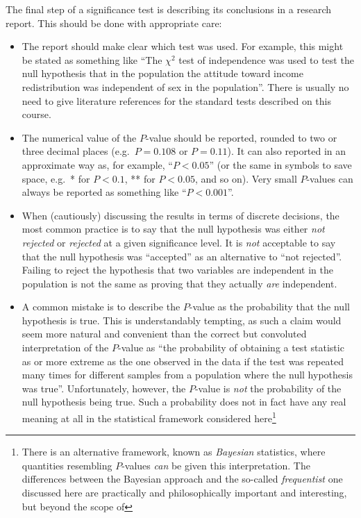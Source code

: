 The final step of a significance test is describing its conclusions in a
research report. This should be done with appropriate care:
\begin{itemize}
\item
The report should make clear which test was used. For example, this
might be stated as something like ``The $\chi^{2}$ test of independence
was used to test the null hypothesis that in the population the attitude toward income
redistribution was independent of sex in the population''.
There is usually no need to give literature references
for the standard tests described on this course.
\item
The numerical value of the $P$-value should be reported, rounded
to two or three decimal places (e.g.\ $P=0.108$ or $P=0.11$). It can
also reported in an approximate way
as, for example, ``$P<0.05$'' (or the
same in symbols to save space,
e.g.\ * for $P<0.1$, ** for $P<0.05$, and so on). Very small
$P$-values can always be reported as
something like ``$P<0.001$''.
\item
When (cautiously) discussing the results in terms of discrete decisions,
the most common practice is to say that the null hypothesis was either
\emph{not rejected} or \emph{rejected} at a given significance level. It
is \emph{not} acceptable to say that the null hypothesis was
``accepted'' as an alternative to ``not rejected''. Failing to reject
the hypothesis that two variables are independent in the population
is not the same as proving that they actually \emph{are} independent.
\item
A common mistake is to describe the $P$-value as the probability that
the null hypothesis is true. This is understandably tempting, as such a
claim would seem more natural and convenient than the correct but convoluted
interpretation of the $P$-value as ``the probability of obtaining a test
statistic as or more extreme as the one observed in the data if the test
was repeated many times for different samples from a population where
the null hypothesis was true''. Unfortunately, however, the $P$-value is
\emph{not} the probability of the null hypothesis being true. Such a
probability does not in fact have any real meaning at all in the
statistical framework considered here\footnote{There is an alternative
framework, known as \emph{Bayesian} statistics,
where quantities resembling $P$-values \emph{can} be
given this interpretation. The differences between the Bayesian
approach and the so-called \emph{frequentist} one discussed here are
practically and philosophically important and interesting, but beyond the scope of
}
\end{itemize}
